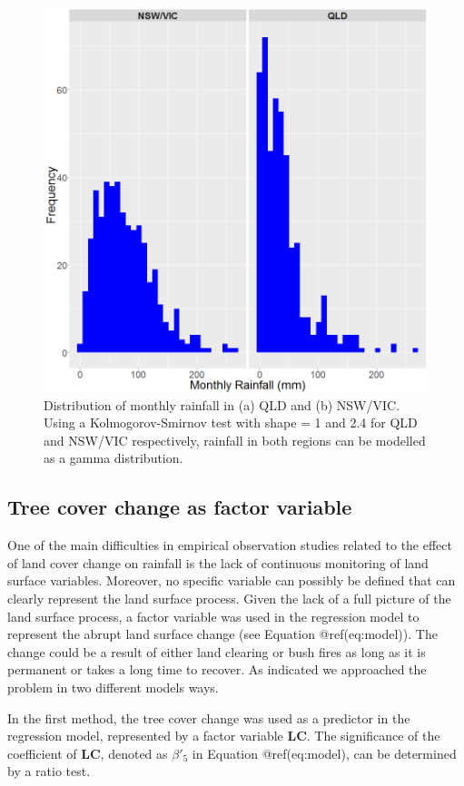 \documentclass[fleqn,10pt,lineno]{wlpeerj} %
\begin{document}
\begin{figure}
\includegraphics[width=0.9\linewidth]{figures/hist_rainfall} \caption{Distribution of monthly rainfall in (a) QLD and (b) NSW/VIC. Using a Kolmogorov-Smirnov test with shape = 1 and 2.4  for QLD and NSW/VIC respectively, rainfall in both regions can be modelled as a gamma distribution.}\label{fig:hist-rain}
\end{figure}

\subsection{Tree cover change as factor variable}

One of the main difficulties in empirical observation studies related to
the effect of land cover change on rainfall is the lack of continuous
monitoring of land surface variables. Moreover, no specific variable can
possibly be defined that can clearly represent the land surface process.
Given the lack of a full picture of the land surface process, a factor
variable was used in the regression model to represent the abrupt land
surface change (see Equation @ref(eq:model)). The change could be a
result of either land clearing or bush fires as long as it is permanent
or takes a long time to recover. As indicated we approached the problem
in two different models ways.

In the first method, the tree cover change was used as a predictor in
the regression model, represented by a factor variable \textbf{LC}. The
significance of the coefficient of \textbf{LC}, denoted as \(\beta'_5\)
in Equation @ref(eq:model), can be determined by a ratio test.
\end{document}
